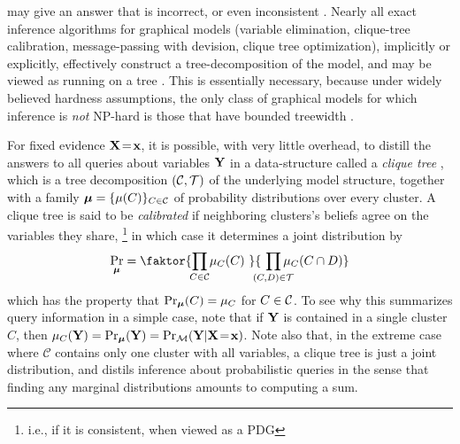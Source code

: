 \documentclass[twoside]{article}
\begin{document}
may give an answer that is incorrect, or even inconsistent \parencite{wainwright2008graphical}. 
Nearly all exact inference algorithms for graphical models (variable elimination, clique-tree calibration, message-passing with devision, clique tree optimization), 
implicitly or explicitly, effectively construct a tree-decomposition of the model, and may be viewed as running on a tree \parencite[\S9-11]{koller2009probabilistic}.
This is essentially necessary, because under widely believed
hardness assumptions, the only class of graphical models for which inference is \emph{not} NP-hard is those that have bounded treewidth \parencite{chandrasekaran2012complexity}.


For fixed evidence $\mathbf{X} \!=\! \mathbf{x}$, it is possible, with very little overhead, to distill the answers to all queries about variables $\mathbf{Y}$ in a data-structure called a \emph{clique tree}
\parencite[\S10]{koller2009probabilistic}, which is a tree decomposition $(\cal C, T)$
of the underlying model structure, together with a family $\boldsymbol\mu = \{\mu(C)\}_{ C \in \mathcal C}$ of probability distributions over every cluster. 
A clique tree is said to be \emph{calibrated} if neighboring clusters's beliefs agree on the variables they share,%
    \footnote{i.e., if it is consistent, when viewed as a PDG}
in which case it determines a joint distribution by
\begin{equation}
    \Pr_{\bmu} = \faktor
        {\prod_{\mathclap{C \in \cal C}} \mu_C(C)~}
        {~\prod_{\mathclap{(C,D) \in \cal T}} \mu_{C}(C \cap D)}
    \label{eq:cliquedist}
\end{equation}
which has the property that $\Pr_{\boldsymbol\mu}(C) = \mu_C$ for $C \in \cal C$. 
To see why this summarizes query information in a simple case, note that if $\mathbf{Y}$ is contained in a single cluster $C$, then $\mu_C(\mathbf{Y}) = \Pr_{\boldsymbol\mu}(\mathbf{Y}) = \Pr_{\cal M}(\mathbf{Y} | \mathbf{X} \!=\! \mathbf{x})$.
Note also that, in the extreme case where $\mathcal C$ contains only one cluster with all variables, a clique tree is just a joint distribution, and distils inference about probabilistic queries in the sense that finding any marginal distributions amounts to computing a sum. 
\end{document}
